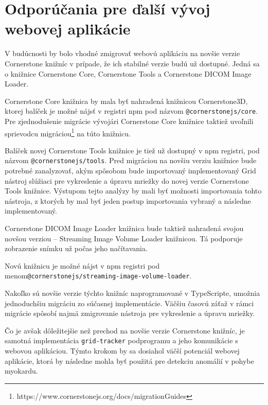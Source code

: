 \chapter {Odporúčania pre ďalší vývoj webovej aplikácie}
V budúcnosti by bolo vhodné zmigrovať webovú aplikáciu na novšie verzie Cornerstone knižníc v prípade, že ich stabilné verzie budú už dostupné. Jedná sa o knižnice Cornerstone Core, Cornerstone Tools a Cornerstone DICOM Image Loader.

Cornerstone Core knižnica by mala byť nahradená knižnicou Cornerstone3D, ktorej balíček je možné nájsť v registri npm pod názvom \newline \texttt{@cornerstonejs/core}. Pre zjednodušenie migrácie vývojári Cornerstone Core knižnice taktiež uvoľnili sprievodcu migráciou\footnote{https://www.cornerstonejs.org/docs/migrationGuides} na túto knižnicu.

Balíček novej Cornerstone Tools knižnice je tiež už dostupný v npm registri, pod názvom \texttt{@cornerstonejs/tools}. Pred migráciou na novšiu verziu knižnice bude potrebné zanalyzovať, akým spôsobom bude importovaný implementovaný Grid nástroj slúžiaci pre vykreslenie a úpravu mriežky do novej verzie Cornerstone Tools knižnice. Výstupom tejto analýzy by mali byť možnosti importovania tohto nástroja, z ktorých by mal byť jeden postup importovania vybraný a následne implementovaný.

\clearpage

Cornerstone DICOM Image Loader knižnica bude taktiež nahradená svojou novšou verziou -- Streaming Image Volume Loader knižnicou. Tá podporuje zobrazenie snímku už počas jeho načítavania.

Novú knižnicu je možné nájst v npm registri pod menom\newline \texttt{@cornerstonejs/streaming-image-volume-loader}.

Nakoľko sú novšie verzie týchto knižníc naprogramované v TypeScripte, umožnia jednoduchšiu migráciu zo súčasnej implementácie. Väčšiu časovú záťaž v rámci migrácie spôsobí najmä zmigrovanie nástroja pre vykreslenie a úpravu mriežky.

Čo je avšak dôležitejšie než prechod na novšie verzie Cornerstone knižníc, je samotná implementácia \texttt{grid-tracker} podprogramu a jeho komunikácie s webovou aplikáciou. Týmto krokom by sa dosiahol väčší potenciál webovej aplikácie, ktorá by následne mohla byť použitá pre detekciu anomálií v pohybe myokardu.